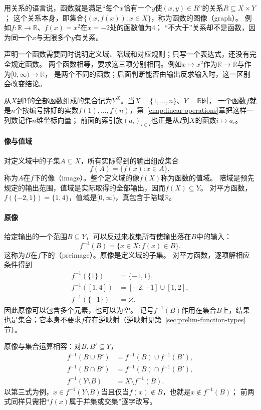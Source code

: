 用关系的语言说，函数就是满足“每个$x$恰有一个$y$使$(x,y)\in R$”的关系$R\subseteq X\times Y$；
这个关系本身，即集合$\{(x,f(x)):x\in X\}$，称为函数的图像（graph）。
例如$f:\mathbb R\to\mathbb R$、$f(x)=x^2$在$x=-2$处的函数值为$4$；
“不大于”关系却不是函数，因为同一个$x$与无限多个$y$有关系。

声明一个函数需要同时说明定义域、陪域和对应规则；只写一个表达式，还没有完全规定函数。
两个函数相等，要求这三项分别相同。例如$x\mapsto x^2$作为$\mathbb R\to\mathbb R$与作为$[0,\infty)\to\mathbb R$，
是两个不同的函数；后面判断能否由输出反求输入时，这一区别会改变结论。

从$X$到$Y$的全部函数组成的集合记为$Y^X$。当$X=\{1,\ldots,n\}$、$Y=\mathbb R$时，
一个函数$f$就是$n$个按编号排好的实数$f(1),\ldots,f(n)$，第~\ref{chap:linear-operations}章把这样一列数记作$n$维坐标向量；
前面的索引族$(a_i)_{i\in I}$也正是从$I$到$X$的函数$i\mapsto a_i$。

\paragraph{像与值域}
对定义域中的子集$A\subseteq X$，所有实际得到的输出组成集合
\[
 f(A)=\{f(x):x\in A\},
\]
称为$A$在$f$下的像（image）。整个定义域的像$f(X)$称为函数的值域。
陪域是预先规定的输出范围，值域是实际取得的全部输出，因而$f(X)\subseteq Y$。
对平方函数，$f(\{-2,1\})=\{1,4\}$，值域是$[0,\infty)$，真包含于陪域$\mathbb R$。

\paragraph{原像}
给定输出的一个范围$B\subseteq Y$，可以反过来收集所有使输出落在$B$中的输入：
\begin{equation}
 f^{-1}(B)=\{x\in X:f(x)\in B\}.
 \label{eq:prelim-preimage}
\end{equation}
这称为$B$在$f$下的（preimage）。原像是定义域的子集。
对平方函数，逐项解相应条件得到
\[
 \begin{aligned}
 f^{-1}(\{1\})&=\{-1,1\},\\
 f^{-1}([1,4])&=[-2,-1]\cup[1,2],\\
 f^{-1}(\{-1\})&=\varnothing.
 \end{aligned}
\]
因此原像可以包含多个元素，也可以为空。
记号$f^{-1}(B)$作用在集合$B$上，结果也是集合；它本身不要求$f$存在逆映射（逆映射见第~\ref{sec:prelim-function-types}节）。

原像与集合运算相容：对$B,B'\subseteq Y$，
\[
 \begin{aligned}
  f^{-1}(B\cup B')&=f^{-1}(B)\cup f^{-1}(B'),\\
  f^{-1}(B\cap B')&=f^{-1}(B)\cap f^{-1}(B'),\\
  f^{-1}(Y\setminus B)&=X\setminus f^{-1}(B).
 \end{aligned}
\]
以第三式为例，$x\in f^{-1}(Y\setminus B)$当且仅当$f(x)\notin B$，也就是$x\notin f^{-1}(B)$；
前两式同样只需把“$f(x)$属于并集或交集”逐字改写。


